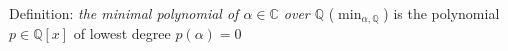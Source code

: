 \documentclass[preview]{standalone}
\begin{document}
\begin{center}
Definition: \textit{the minimal polynomial of $\alpha \in \mathbb{C}$ over $\mathbb{Q}$} ($\min_{\alpha, \mathbb{Q}}$) is the polynomial $p \in \mathbb{Q}[x]$ of lowest degree $p(\alpha) = 0$
\end{center}
\end{document}
